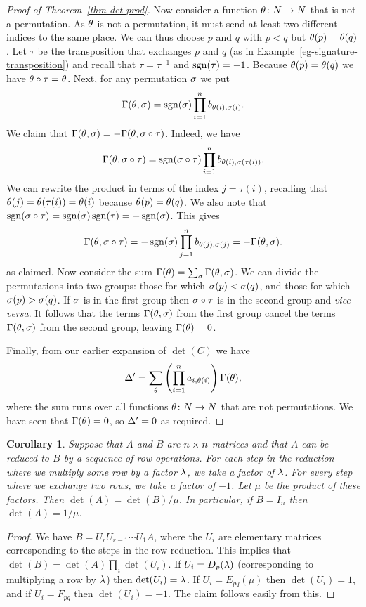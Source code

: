 \documentclass[reqno]{amsart}
\newtheorem{corollary}[theorem]{Corollary}
\theoremstyle{definition}
\begin{document}
\begin{proof}[Proof of Theorem~\ref{thm-det-prod}]
 Now consider a function $\theta\colon N\to N$ that is not a permutation.  As
 $\theta$ is not a permutation, it must send at least two different
 indices to the same place.  We can thus choose $p$ and $q$ with $p<q$
 but $\theta(p)=\theta(q)$.  Let $\tau$ be the transposition that
 exchanges $p$ and $q$ (as in
 Example~\ref{eg-signature-transposition}) and recall that
 $\tau=\tau^{-1}$ and $\operatorname{sgn}(\tau)=-1$.  Because $\theta(p)=\theta(q)$ we
 have $\theta\circ\tau=\theta$.  Next, for any permutation $\sigma$ we put
 \[ \Gamma(\theta,\sigma) = \operatorname{sgn}(\sigma)\prod_{i=1}^n b_{\theta(i),\sigma(i)}. \]
 We claim that $\Gamma(\theta,\sigma)=-\Gamma(\theta,\sigma\circ\tau)$.  Indeed, we
 have
 \[ \Gamma(\theta,\sigma\circ\tau) =
     \operatorname{sgn}(\sigma\circ\tau)\prod_{i=1}^n b_{\theta(i),\sigma(\tau(i))}.
 \]
 We can rewrite the product in terms of the index $j=\tau(i)$,
 recalling that $\theta(j)=\theta(\tau(i))=\theta(i)$ because
 $\theta(p)=\theta(q)$.  We also note that
 $\operatorname{sgn}(\sigma\circ\tau)=\operatorname{sgn}(\sigma)\operatorname{sgn}(\tau)=-\operatorname{sgn}(\sigma)$.  This gives
 \[ \Gamma(\theta,\sigma\circ\tau) =
     -\operatorname{sgn}(\sigma)\prod_{j=1}^n b_{\theta(j),\sigma(j)} = -\Gamma(\theta,\sigma).
 \]
 as claimed.  Now consider the sum $\Gamma(\theta)=\sum_\sigma\Gamma(\theta,\sigma)$.
 We can divide the permutations into two groups: those for which
 $\sigma(p)<\sigma(q)$, and those for which $\sigma(p)>\sigma(q)$.  If $\sigma$ is in
 the first group then $\sigma\circ\tau$ is in the second group and
 \emph{vice-versa}.  It follows that the terms $\Gamma(\theta,\sigma)$ from
 the first group cancel the terms $\Gamma(\theta,\sigma)$ from the second
 group, leaving $\Gamma(\theta)=0$.

 Finally, from our earlier expansion of $\det(C)$ we have
 \[ \Delta' =
     \sum_\theta \left(\prod_{i=1}^na_{i,\theta(i)}\right) \Gamma(\theta),
 \]
 where the sum runs over all functions $\theta\colon N\to N$ that are not
 permutations.  We have seen that $\Gamma(\theta)=0$, so $\Delta'=0$ as
 required.
\end{proof}

\begin{corollary}\label{cor-det-row-ops}
 Suppose that $A$ and $B$ are $n\times n$ matrices and that $A$ can be
 reduced to $B$ by a sequence of row operations.  For each step in the
 reduction where we multiply some row by a factor $\lambda$, we take a
 factor of $\lambda$.  For every step where we exchange two rows, we take
 a factor of $-1$.  Let $\mu$ be the product of these factors.  Then
 $\det(A)=\det(B)/\mu$.  In particular, if $B=I_n$ then
 $\det(A)=1/\mu$.
\end{corollary}
\begin{proof}
 We have $B=U_rU_{r-1}\dotsb U_1A$, where the $U_i$ are elementary
 matrices corresponding to the steps in the row reduction.  This
 implies that $\det(B)=\det(A)\prod_i\det(U_i)$.  If $U_i=D_p(\lambda)$
 (corresponding to multiplying a row by $\lambda$) then $\det(U_i)=\lambda$.
 If $U_i=E_{pq}(\mu)$ then $\det(U_i)=1$, and if $U_i=F_{pq}$ then
 $\det(U_i)=-1$.  The claim follows easily from this.
\end{proof}
\end{document}
